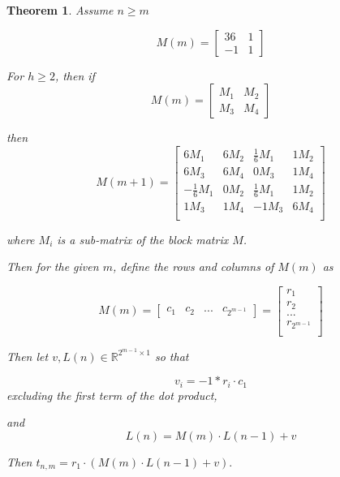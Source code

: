 \documentclass[12pt]{article}
\theoremstyle{plain}
\newtheorem{thm}{Theorem}
\theoremstyle{definition}
\theoremstyle{remark}
\theoremstyle{definition}
\begin{document}
\begin{thm}

Assume $n \geq m $

$$
M(m) = \begin{bmatrix}
36 & 1 \\
-1 & 1
\end{bmatrix}
$$

For $h \geq 2$, then if
$$
M(m) = \begin{bmatrix}
M_1 & M_2 \\
M_3 & M_4
\end{bmatrix}
$$

then
$$
M(m+1) = \begin{bmatrix}
6M_1 & 6M_2 & \frac{1}{6}M_1 & 1M_2 \\
6M_3 & 6M_4 & 0M_3 & 1M_4 \\
-\frac{1}{6}M_1 & 0M_2 & \frac{1}{6}M_1 & 1M_2 \\
1M_3 & 1M_4 & -1M_3 & 6M_4 \\
\end{bmatrix}
$$

where $M_i$ is a sub-matrix of the block matrix $M$.

Then for the given $m$, define the rows and columns of $M(m)$ as

$$
M(m) = 
\begin{bmatrix}
    c_1 & c_2 & ... & c_{2^{m-1}}
\end{bmatrix} = 
\begin{bmatrix}
    r_1 \\
    r_2 \\
    ... \\
    r_{2^{m-1}} \\
\end{bmatrix}
$$

Then let $v,L(n) \in \mathbb{R}^{2^{m-1} \times 1}$ so that

$$v_i = -1*r_i \cdot c_1$$
excluding the first term of the dot product,

and
$$L(n) = M(m) \cdot L(n-1)+v$$

Then $t_{n,m}=r_1 \cdot (M(m) \cdot L(n-1)+v).$

\end{thm}
\end{document}
